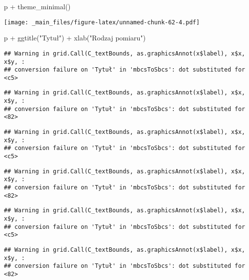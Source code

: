 \documentclass[
]{book}
\newenvironment{Shaded}{\begin{snugshade}}{\end{snugshade}}
\newcommand{\FunctionTok}[1]{\textcolor[rgb]{0.00,0.00,0.00}{#1}}
\newcommand{\NormalTok}[1]{#1}
\newcommand{\SpecialCharTok}[1]{\textcolor[rgb]{0.00,0.00,0.00}{#1}}
\newcommand{\StringTok}[1]{\textcolor[rgb]{0.31,0.60,0.02}{#1}}
\begin{document}
\begin{Shaded}
\begin{Highlighting}[]
\NormalTok{p }\SpecialCharTok{+} \FunctionTok{theme\_minimal}\NormalTok{()}
\end{Highlighting}
\end{Shaded}

\texttt{[image: \_main\_files/figure-latex/unnamed-chunk-62-4.pdf]}

\begin{Shaded}
\begin{Highlighting}[]
\NormalTok{p }\SpecialCharTok{+} \FunctionTok{ggtitle}\NormalTok{(}\StringTok{"Tytuł"}\NormalTok{) }\SpecialCharTok{+} \FunctionTok{xlab}\NormalTok{(}\StringTok{"Rodzaj pomiaru"}\NormalTok{)}
\end{Highlighting}
\end{Shaded}

\begin{verbatim}
## Warning in grid.Call(C_textBounds, as.graphicsAnnot(x$label), x$x, x$y, :
## conversion failure on 'Tytuł' in 'mbcsToSbcs': dot substituted for <c5>
\end{verbatim}

\begin{verbatim}
## Warning in grid.Call(C_textBounds, as.graphicsAnnot(x$label), x$x, x$y, :
## conversion failure on 'Tytuł' in 'mbcsToSbcs': dot substituted for <82>
\end{verbatim}

\begin{verbatim}
## Warning in grid.Call(C_textBounds, as.graphicsAnnot(x$label), x$x, x$y, :
## conversion failure on 'Tytuł' in 'mbcsToSbcs': dot substituted for <c5>
\end{verbatim}

\begin{verbatim}
## Warning in grid.Call(C_textBounds, as.graphicsAnnot(x$label), x$x, x$y, :
## conversion failure on 'Tytuł' in 'mbcsToSbcs': dot substituted for <82>
\end{verbatim}

\begin{verbatim}
## Warning in grid.Call(C_textBounds, as.graphicsAnnot(x$label), x$x, x$y, :
## conversion failure on 'Tytuł' in 'mbcsToSbcs': dot substituted for <c5>
\end{verbatim}

\begin{verbatim}
## Warning in grid.Call(C_textBounds, as.graphicsAnnot(x$label), x$x, x$y, :
## conversion failure on 'Tytuł' in 'mbcsToSbcs': dot substituted for <82>
\end{verbatim}
\end{document}
